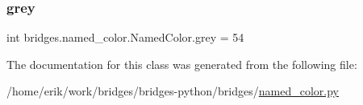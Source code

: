 \subsubsection{\texorpdfstring{grey}{grey}}
{\footnotesize\ttfamily int bridges.\+named\+\_\+color.\+Named\+Color.\+grey = 54\hspace{0.3cm}{\ttfamily [static]}}



The documentation for this class was generated from the following file\+:\begin{DoxyCompactItemize}
\item 
/home/erik/work/bridges/bridges-\/python/bridges/\hyperlink{named__color_8py}{named\+\_\+color.\+py}\end{DoxyCompactItemize}
